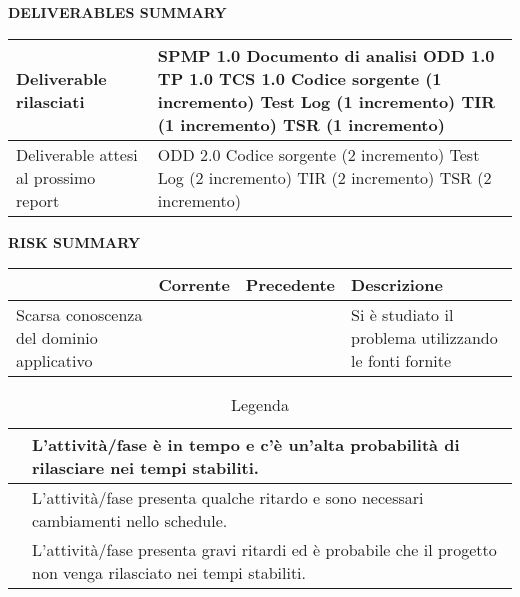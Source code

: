 \begin{center} \textbf{DELIVERABLES SUMMARY} \end{center}
\begin{table}[ht]
\centering
\begin{tabular}{|g|p{8cm}|}
  \hline
  Deliverable rilasciati				& \footnotesize SPMP 1.0\newline
							Documento di analisi\newline
							ODD 1.0\newline
							TP 1.0\newline
							TCS 1.0\newline
							Codice sorgente (1 incremento)\newline
							Test Log (1 incremento)\newline
							TIR (1 incremento)\newline
							TSR (1 incremento)\\
  \hline
  Deliverable attesi al prossimo report 		& \footnotesize ODD 2.0\newline
							Codice sorgente (2 incremento)\newline
							Test Log (2 incremento)\newline
							TIR (2 incremento)\newline
							TSR (2 incremento)\\
  \hline
\end{tabular}
\end{table}
\newpage

\begin{center} \textbf{RISK SUMMARY} \end{center}
\begin{table}[ht]
\centering
\begin{tabular}{|p{3cm}|p{2cm}|p{2cm}|p{5cm}|}
  \hline
  \rowcolor{Gray}	& Corrente		& Precedente		& Descrizione\\
  \hline
  \footnotesize Scarsa conoscenza del dominio applicativo	& \cellcolor{green}	& \cellcolor{yellow}			& \footnotesize Si è studiato il problema utilizzando le fonti fornite\\
  \hline
\end{tabular}
\end{table}

\begin{table}[b]
 \centering
 \begin{tabular}{|p{3cm}|p{10cm}|}
  \hline
  \cellcolor{green}			& L'attività/fase è in tempo e c'è un'alta probabilità di rilasciare nei tempi stabiliti.\\
  \hline
  \cellcolor{yellow}			& L'attività/fase presenta qualche ritardo e sono necessari cambiamenti nello schedule.\\
  \hline
  \cellcolor{red}			& L'attività/fase presenta gravi ritardi ed è probabile che il progetto non venga rilasciato nei tempi stabiliti.\\
  \hline
 \end{tabular}
 \caption{Legenda}
\end{table}
